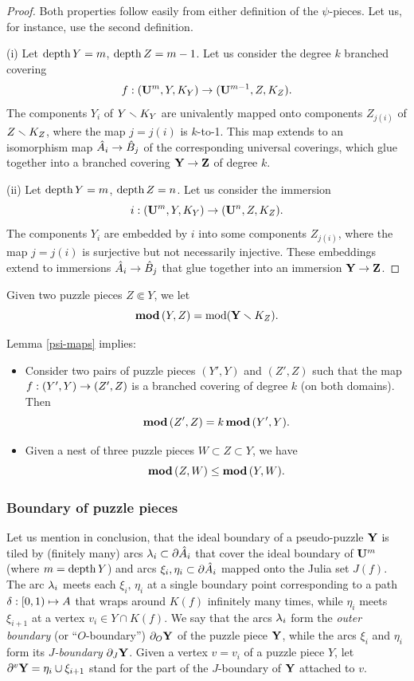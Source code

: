 \begin{proof}
  Both properties follow easily from either definition of the $\psi$-pieces.
Let us, for instance, use the second definition.

(i)
Let $\operatorname{depth} Y=m$, $\operatorname{depth} Z=m-1$. Let us consider the degree $k$ branched covering
$$
    f: ({\mathbf{U}}^m, Y, K_Y) \rightarrow ({\mathbf{U}}^{m-1}, Z, K_Z).
$$
The components $Y_i$ of $Y\smallsetminus K_Y$
are univalently mapped onto components $Z_{j(i)}$ of $Z\smallsetminus K_Z$, where the map
$j=j(i)$ is $k$-to-1.
This map extends to an isomorphism map $\hat A_i\rightarrow \hat B_j $
of the corresponding universal coverings, which glue together into a branched covering
${\mathbf{Y}}\rightarrow {\mathbf{Z}}$ of degree $k$.

(ii) Let $\operatorname{depth} Y=m$, $\operatorname{depth} Z=n$.
Let us  consider the immersion
$$
  i: ({\mathbf{U}}^m, Y, K_Y) \rightarrow ({\mathbf{U}}^n, Z, K_Z).
$$
The components $Y_i$ are embedded by $i$ into some components $Z_{j(i)}$,
where the map $j=j(i)$ is surjective but not necessarily injective.
These embeddings extend to immersions $\hat A_i\rightarrow \hat B_j$ that
glue together into an immersion ${\mathbf{Y}}\rightarrow {\mathbf{Z}}$.
\end{proof}


 Given two puzzle pieces $Z\Subset Y$, we let
$$
  { \mathbf{mod}\, } (Y,Z) = \operatorname{mod}({\mathbf{Y}}\smallsetminus K_Z).
$$

Lemma \ref{psi-maps} implies:

\begin{lem}\label{psi-mod}
\begin{itemize}
  \item [(i)]  Consider two pairs of puzzle pieces $(Y',Y)$ and $(Z',Z)$
such that the map $f: (Y',Y)\rightarrow (Z',Z)$ is a branched covering
of degree $k$ (on both domains).
Then $${ \mathbf{mod}\, }(Z',Z)=k\, { \mathbf{mod}\, }(Y',Y).$$

\item [(ii)] Given a nest of three puzzle pieces $W\subset Z\subset  Y$,
we have $${ \mathbf{mod}\, }(Z,W)\leq { \mathbf{mod}\, }(Y,W).$$
\end{itemize}
\end{lem}


\subsubsection{Boundary of puzzle pieces}\label{boundary}
Let us mention in conclusion, that the ideal boundary of a pseudo-puzzle ${\mathbf{Y}}$
is tiled by (finitely many) arcs $\lambda_i\subset \partial \hat A_i$
that cover the ideal boundary of ${\mathbf{U}}^m$ (where $m=\operatorname{depth} Y$)
and arcs $\xi_i, \eta_i \subset \partial \hat A_i$ mapped onto the Julia set $J(f)$.
The arc ${\lambda}_i$ meets each $\xi_i,\, \eta_i$ at a single boundary point
corresponding to a path ${\delta}: [0,1)\mapsto A$ that wraps around $K(f)$ infinitely many times,
while $\eta_i$ meets $\xi_{i+1}$ at a vertex $v_i\in Y\cap K(f)$.
We say  that the arcs ${\lambda}_i$ form the {\it outer boundary } (or ``$O$-boundary'')
 $\partial_O{\mathbf{Y}}$ of the puzzle piece ${\mathbf{Y}}$,
while the arcs $\xi_i$ and $\eta_i$
form its {\it $J$-boundary} $\partial_J {\mathbf{Y}}$.
Given a vertex $v=v_i$ of a puzzle piece $Y$, let $\partial^v{\mathbf{Y}}=\eta_i\cup \xi_{i+1}$
stand for the part of the $J$-boundary of ${\mathbf{Y}}$ attached to $v$.

